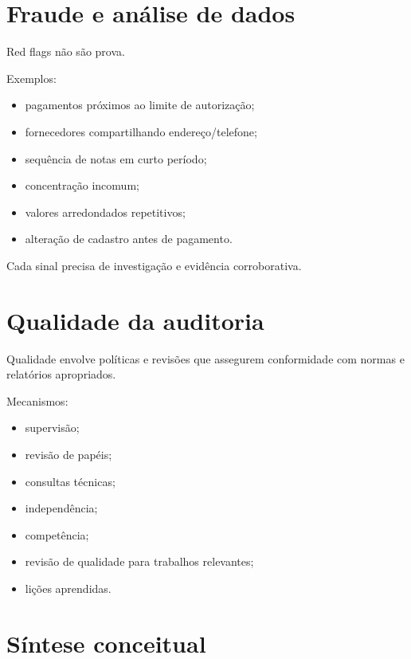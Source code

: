 \section{Fraude e análise de dados}

Red flags não são prova.

Exemplos:
\begin{itemize}
\item pagamentos próximos ao limite de autorização;
\item fornecedores compartilhando endereço/telefone;
\item sequência de notas em curto período;
\item concentração incomum;
\item valores arredondados repetitivos;
\item alteração de cadastro antes de pagamento.
\end{itemize}

Cada sinal precisa de investigação e evidência corroborativa.

\section{Qualidade da auditoria}

Qualidade envolve políticas e revisões que assegurem conformidade com normas e relatórios apropriados.

Mecanismos:
\begin{itemize}
\item supervisão;
\item revisão de papéis;
\item consultas técnicas;
\item independência;
\item competência;
\item revisão de qualidade para trabalhos relevantes;
\item lições aprendidas.
\end{itemize}

\section{Síntese conceitual}

